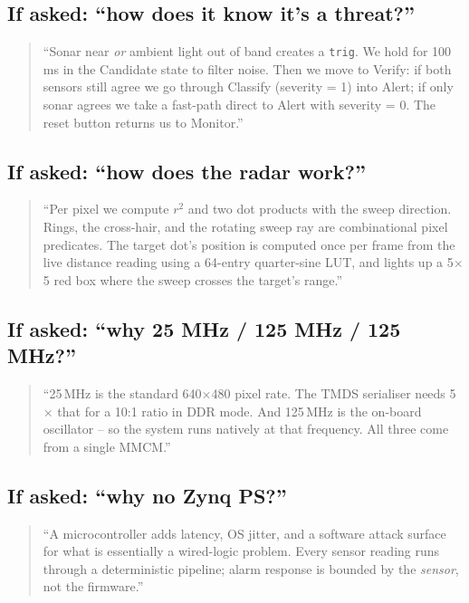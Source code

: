 \documentclass[11pt,a4paper]{article}
\begin{document}
\subsection*{If asked: ``how does it know it's a threat?''}

\begin{quote}
``Sonar near \emph{or} ambient light out of band creates a
\texttt{trig}.  We hold for 100\,ms in the Candidate state to filter
noise.  Then we move to Verify: if both sensors still agree we go
through Classify (severity = 1) into Alert; if only sonar agrees we
take a fast-path direct to Alert with severity = 0.  The reset button
returns us to Monitor.''
\end{quote}

\subsection*{If asked: ``how does the radar work?''}

\begin{quote}
``Per pixel we compute $r^2$ and two dot products with the sweep
direction.  Rings, the cross-hair, and the rotating sweep ray are
combinational pixel predicates.  The target dot's position is computed
once per frame from the live distance reading using a 64-entry
quarter-sine LUT, and lights up a 5$\times$5 red box where the sweep
crosses the target's range.''
\end{quote}

\subsection*{If asked: ``why 25 MHz / 125 MHz / 125 MHz?''}

\begin{quote}
``25\,MHz is the standard 640$\times$480 pixel rate.  The TMDS
serialiser needs 5$\times$ that for a 10:1 ratio in DDR mode.  And
125\,MHz is the on-board oscillator -- so the system runs natively at
that frequency.  All three come from a single MMCM.''
\end{quote}

\subsection*{If asked: ``why no Zynq PS?''}

\begin{quote}
``A microcontroller adds latency, OS jitter, and a software
attack surface for what is essentially a wired-logic problem.  Every
sensor reading runs through a deterministic pipeline; alarm response
is bounded by the \emph{sensor}, not the firmware.''
\end{quote}
\end{document}
